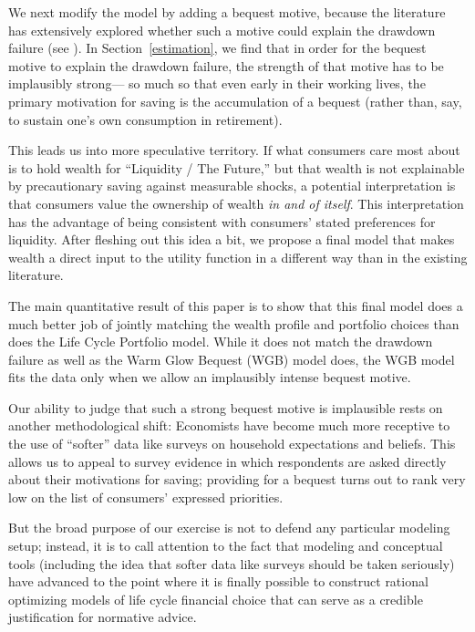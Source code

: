 \documentclass[12pt,letterpaper, fleqn]{article}
\begin{document}
We next modify the model by adding a bequest motive, because the literature has extensively explored whether such a motive could explain the drawdown failure (see \cite{DeNardi2016d}).
In Section~\ref{estimation}, we find that in order for the bequest motive to explain the drawdown failure, the strength of that motive has to be implausibly strong--- so much so that even early in their working lives, the primary motivation for saving is the accumulation of a bequest (rather than, say, to sustain one's own consumption in retirement).

This leads us into more speculative territory.
If what consumers care most about is to hold wealth for ``Liquidity / The Future,'' but that wealth is not explainable by precautionary saving against measurable shocks, a potential interpretation is that consumers value the ownership of wealth \textit{in and of itself}. This interpretation has the advantage of being consistent with consumers' stated preferences for liquidity.
After fleshing out this idea a bit, we propose a final model that makes wealth a direct input to the utility function in a different way than in the existing literature.

The main quantitative result of this paper is to show that this final model does a much better job of jointly matching the wealth profile and portfolio choices than does the Life Cycle Portfolio model. While it does not match the drawdown failure as well as the Warm Glow Bequest (WGB) model does, the WGB model fits the data only when we allow an implausibly intense bequest motive.

Our ability to judge that such a strong bequest motive is implausible rests on another methodological shift: Economists have become much more receptive to the use of ``softer'' data like surveys on household expectations and beliefs.
This allows us to appeal to survey evidence in which respondents are asked directly about their motivations for saving; providing for a bequest turns out to rank very low on the list of consumers' expressed priorities.

But the broad purpose of our exercise is not to defend any particular modeling setup; instead, it is to call attention to the fact that modeling and conceptual tools (including the idea that softer data like surveys should be taken seriously) have advanced to the point where it is finally possible to construct rational optimizing models of life cycle financial choice that can serve as a credible justification for normative advice.
\end{document}

